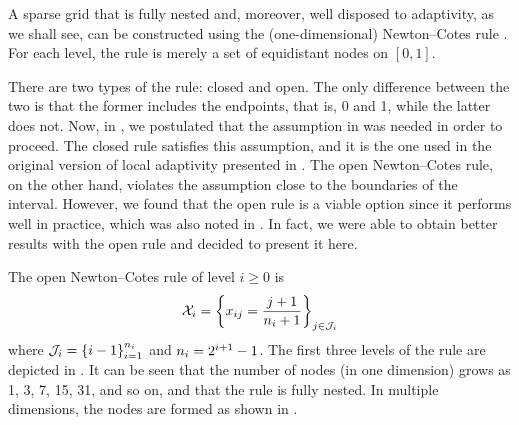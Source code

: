 A sparse grid that is fully nested and, moreover, well disposed to adaptivity,
as we shall see, can be constructed using the (one-dimensional) Newton--Cotes
rule \cite{ma2009}. For each level, the rule is merely a set of equidistant
nodes on $[0, 1]$.

There are two types of the rule: closed and open. The only difference between
the two is that the former includes the endpoints, that is, 0 and 1, while the
latter does not. Now, in , we postulated that the assumption in
 was needed in order to proceed. The closed rule
satisfies this assumption, and it is the one used in the original version of
local adaptivity presented in \cite{ma2009}. The open Newton--Cotes rule, on the
other hand, violates the assumption close to the boundaries of the interval.
However, we found that the open rule is a viable option since it performs well
in practice, which was also noted in \cite{klimke2006}. In fact, we were able to
obtain better results with the open rule and decided to present it here.

The open Newton--Cotes rule of level $i \geq 0$ is
\begin{equation} \elab{newton-cotes-grid}
  \X_i = \left\{ x_{ij} = \frac{j + 1}{\n_i + 1} \right\}_{j \in \oindex_i}
\end{equation}
where $\mathcal{J}_i = \left\{ i - 1 \right\}_{i = 1}^{n_i}$ and $n_i = 2^{i + 1}
- 1$. The first three levels of the rule are depicted in . It can be
seen that the number of nodes (in one dimension) grows as 1, 3, 7, 15, 31, and
so on, and that the rule is fully nested. In multiple dimensions, the nodes are
formed as shown in .
